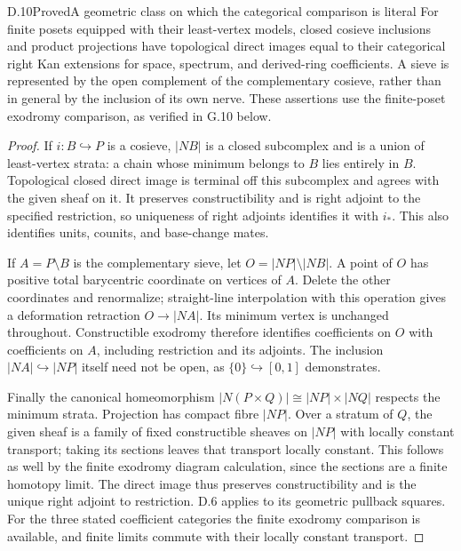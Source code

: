 \begin{claim}{D.10}{Proved}{A geometric class on which the categorical comparison is literal}
For finite posets equipped with their least-vertex models, closed
cosieve inclusions and product projections have topological direct
images equal to their categorical right Kan extensions for space,
spectrum, and derived-ring coefficients. A sieve is represented by
the open complement of the complementary cosieve, rather than in
general by the inclusion of its own nerve. These assertions use the
finite-poset exodromy comparison, as verified in G.10 below.
\end{claim}
\begin{proof}
If $i:B\hookrightarrow P$ is a cosieve, $|NB|$ is a closed
subcomplex and is a union of least-vertex strata: a chain whose
minimum belongs to $B$ lies entirely in $B$. Topological closed
direct image is terminal off this subcomplex and agrees with the
given sheaf on it. It preserves constructibility and is right
adjoint to the specified restriction, so uniqueness of right
adjoints identifies it with $i_*$. This also identifies units,
counits, and base-change mates.

If $A=P\setminus B$ is the complementary sieve, let
$O=|NP|\setminus|NB|$. A point of $O$ has positive total barycentric
coordinate on vertices of $A$. Delete the other coordinates and
renormalize; straight-line interpolation with this operation gives
a deformation retraction $O\to|NA|$. Its minimum vertex is unchanged
throughout. Constructible exodromy therefore identifies coefficients
on $O$ with coefficients on $A$, including restriction and its
adjoints. The inclusion $|NA|\hookrightarrow|NP|$ itself need not
be open, as $\{0\}\hookrightarrow[0,1]$ demonstrates.

Finally the canonical homeomorphism
$|N(P\times Q)|\cong|NP|\times|NQ|$ respects the minimum strata.
Projection has compact fibre $|NP|$. Over a stratum of $Q$, the
given sheaf is a family of fixed constructible sheaves on $|NP|$
with locally constant transport; taking its sections leaves that
transport locally constant. This follows as well by the finite
exodromy diagram calculation, since the sections are a finite
homotopy limit. The direct image thus preserves constructibility
and is the unique right adjoint to restriction. D.6 applies to its
geometric pullback squares. For the three stated coefficient
categories the finite exodromy comparison is available, and finite
limits commute with their locally constant transport.
\end{proof}


